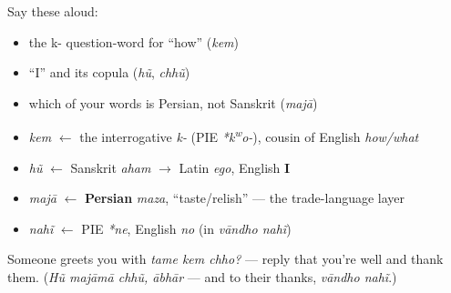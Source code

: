 \begin{cousinweb}
Say these aloud:

\begin{itemize}
\raggedright
  \item the k- question-word for \textquotedblleft{}how\textquotedblright{} (\emph{kem})
  \item \textquotedblleft{}I\textquotedblright{} and its copula (\emph{hũ}, \emph{chhũ})
  \item which of your words is Persian, not Sanskrit (\emph{majā})
\end{itemize}
\end{cousinweb}

\begin{grammarlens}[title={What you've built — roots you now carry}]
\begin{itemize}
\raggedright
  \item \emph{kem} $\leftarrow$ the interrogative \emph{k-} (PIE \emph{*k\textsuperscript{w}o-}), cousin of English \emph{how/what}
  \item \emph{hũ} $\leftarrow$ Sanskrit \emph{aham} $\to$ Latin \emph{ego}, English \textbf{I}
  \item \emph{majā} $\leftarrow$ \textbf{Persian} \emph{maza}, \textquotedblleft{}taste/relish\textquotedblright{} — the trade-language layer
  \item \emph{nahĩ} $\leftarrow$ PIE \emph{*ne}, English \emph{no} (in \emph{vāndho nahĩ})
\end{itemize}
\end{grammarlens}

\begin{tcolorbox}[breakable,colback=teal!4,colframe=teal!35!black,title={Before you move on}]
Someone greets you with \emph{tame kem chho?} — reply that you're well and thank them. (\emph{Hũ majāmā chhũ, ābhār} — and to their thanks, \emph{vāndho nahĩ}.)
\end{tcolorbox}
